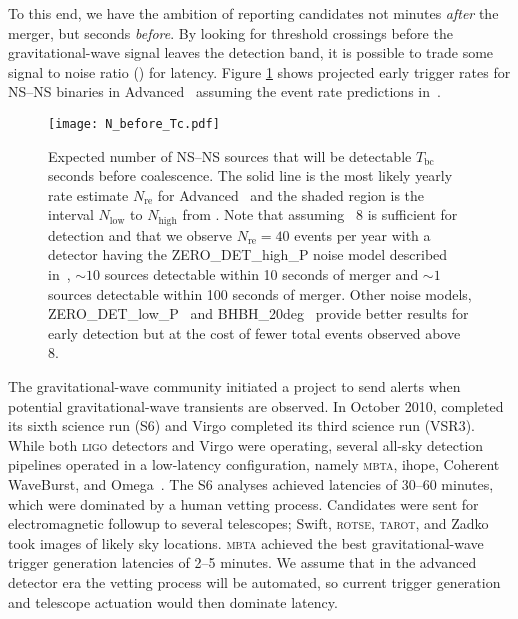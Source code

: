 To this end, we have the ambition of reporting candidates not minutes
\emph{after} the merger, but seconds \emph{before}.    By
looking for threshold crossings before the gravitational-wave signal leaves
the detection band, it is possible to trade some signal to noise ratio (\SNR{})
for latency.  Figure \ref{fig:earlywarning} shows projected early trigger rates
for NS--NS binaries in Advanced \LIGO\ assuming the event rate predictions
in~\cite{Abadie:2010p10836}.
%
\begin{figure}
\texttt{[image: N\_before\_Tc.pdf]}
\caption{\label{fig:earlywarning} Expected number of NS--NS sources that will
be detectable $T_\mathrm{bc}$ seconds before coalescence.  The solid line is the most
likely yearly rate estimate $N_{\mathrm{re}}$ for Advanced \LIGO\ and the
shaded region is the interval $N_{\mathrm{low}}$ to $N_{\mathrm{high}}$ from
\cite{Abadie:2010p10836}.  Note that assuming \SNR\ 8 is sufficient for
detection and that we observe $N_{\mathrm{re}} = 40$ events per year with a
detector having the ZERO\_DET\_high\_P noise model described
in~\cite{ALIGONoiseZERO_DET_high_P}, $\sim10$ sources detectable within 10
seconds of merger and $\sim1$ sources detectable within 100 seconds of
merger.  Other noise models, ZERO\_DET\_low\_P~\cite{ALIGONoiseZERO_DET_low_P}
and BHBH\_20deg~\cite{ALIGONoiseBHBH_20deg} provide better results for early
detection but at the cost of fewer total events observed above \SNR{} 8.}
\end{figure}

 The gravitational-wave community
initiated a project to send alerts when potential gravitational-wave transients
are observed.  In October 2010, \LIGO{} completed its sixth science run
(S6) and Virgo completed its third science run (VSR3).  While both
\textsc{ligo} detectors and Virgo were operating, several all-sky detection
pipelines operated in a low-latency configuration, namely \textsc{mbta}, ihope,
Coherent WaveBurst, and Omega~\cite{HugheyGWPAW2011, S6lowlatency}.
 The S6 analyses
achieved latencies of 30--60 minutes, which were dominated by a human vetting
process. Candidates were sent for electromagnetic followup to several
telescopes; Swift, \textsc{rotse}, \textsc{tarot}, and Zadko~\cite{kanner2008,
HugheyGWPAW2011} took images of likely sky locations.  \textsc{mbta} achieved
the best gravitational-wave trigger generation latencies of 2--5 minutes.  We
assume that in the advanced detector era the vetting process will be automated,
so current trigger generation and telescope actuation would then dominate
latency.

